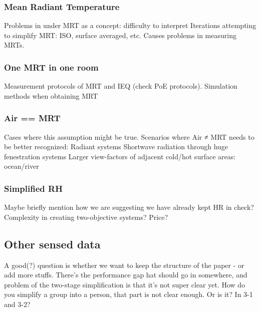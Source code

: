 \subsubsection{Mean Radiant Temperature}
            Problems in under MRT as a concept: difficulty to interpret Iterations attempting to simplify MRT: ISO, surface averaged, etc. Causes problems in measuring MRTs.
\subsubsection{One MRT in one room}
            Measurement protocols of MRT and IEQ (check PoE protocols). 
            Simulation methods when obtaining MRT
\subsubsection{Air == MRT}
            Cases where this assumption might be true.
            Scenarios where Air ≠ MRT needs to be better recognized:
            Radiant systems
            Shortwave radiation through huge fenestration systems
            Larger view-factors of adjacent cold/hot surface areas: ocean/river
\subsubsection{Simplified RH}
            Maybe briefly mention how we are suggesting we have already kept HR in check?
            Complexity in creating two-objective systems? Price?
\subsection{Other sensed data}
    A good(?) question is whether we want to keep the structure of the paper - or add more stuffs. There's the performance gap hat should go in somewhere, and problem of the two-stage simplification is that it's not super clear yet. How do you simplify a group into a person, that part is not clear enough. Or is it? In 3-1 and 3-2? 